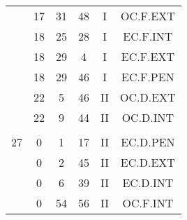 \documentclass[12pt, a4paper]{article}
\begin{document}
\begin{multicols}{3}
{\begin{tabular}{c c c c c c}
	 	 	 	 & 17 & 31 & 48 & I & OC.F.EXT\\%
	 	 	 	 & 18 & 25 & 28 & I & EC.F.INT\\%
	 	 	 	 & 18 & 29 & 4 & I & EC.F.EXT\\%
	 	 	 	 & 18 & 29 & 46 & I & EC.F.PEN\\%
	 	 	 	 & 22 & 5 & 46 & II & OC.D.EXT\\%
	 	 	 	 & 22 & 9 & 44 & II & OC.D.INT\\%
	 	 	 	 & & & & & \\%
	 	 	 	27 & 0 & 1 & 17 & II & EC.D.PEN\\%
	 	 	 	 & 0 & 2 & 45 & II & EC.D.EXT\\%
	 	 	 	 & 0 & 6 & 39 & II & EC.D.INT\\%
	 	 	 	 & 0 & 54 & 56 & II & OC.F.INT\\%
	 	 \end{tabular}
 	}
\end{multicols}
\end{document}

